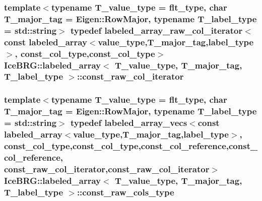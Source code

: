 \subsubsection[{const\+\_\+raw\+\_\+col\+\_\+iterator}]{\setlength{\rightskip}{0pt plus 5cm}template$<$typename T\+\_\+value\+\_\+type = flt\+\_\+type, char T\+\_\+major\+\_\+tag = Eigen\+::\+Row\+Major, typename T\+\_\+label\+\_\+type = std\+::string$>$ typedef {\bf labeled\+\_\+array\+\_\+raw\+\_\+col\+\_\+iterator}$<$const {\bf labeled\+\_\+array}$<${\bf value\+\_\+type},T\+\_\+major\+\_\+tag,{\bf label\+\_\+type}$>$, {\bf const\+\_\+col\+\_\+type},{\bf const\+\_\+col\+\_\+type}$>$ {\bf Ice\+B\+R\+G\+::labeled\+\_\+array}$<$ T\+\_\+value\+\_\+type, T\+\_\+major\+\_\+tag, T\+\_\+label\+\_\+type $>$\+::{\bf const\+\_\+raw\+\_\+col\+\_\+iterator}}\label{classIceBRG_1_1labeled__array_acfa6b748c386d02309a161e84f02e59d}
\hypertarget{classIceBRG_1_1labeled__array_a6aed831097e39e3fdd483625fea14042}{}
\subsubsection[{const\+\_\+raw\+\_\+cols\+\_\+type}]{\setlength{\rightskip}{0pt plus 5cm}template$<$typename T\+\_\+value\+\_\+type = flt\+\_\+type, char T\+\_\+major\+\_\+tag = Eigen\+::\+Row\+Major, typename T\+\_\+label\+\_\+type = std\+::string$>$ typedef {\bf labeled\+\_\+array\+\_\+vecs}$<$const {\bf labeled\+\_\+array}$<${\bf value\+\_\+type},T\+\_\+major\+\_\+tag,{\bf label\+\_\+type}$>$, {\bf const\+\_\+col\+\_\+type},{\bf const\+\_\+col\+\_\+type},{\bf const\+\_\+col\+\_\+reference},{\bf const\+\_\+col\+\_\+reference}, {\bf const\+\_\+raw\+\_\+col\+\_\+iterator},{\bf const\+\_\+raw\+\_\+col\+\_\+iterator}$>$ {\bf Ice\+B\+R\+G\+::labeled\+\_\+array}$<$ T\+\_\+value\+\_\+type, T\+\_\+major\+\_\+tag, T\+\_\+label\+\_\+type $>$\+::{\bf const\+\_\+raw\+\_\+cols\+\_\+type}}\label{classIceBRG_1_1labeled__array_a6aed831097e39e3fdd483625fea14042}
\hypertarget{classIceBRG_1_1labeled__array_aeac7979069eab6c371dca3e6f3dd9ee9}{}
